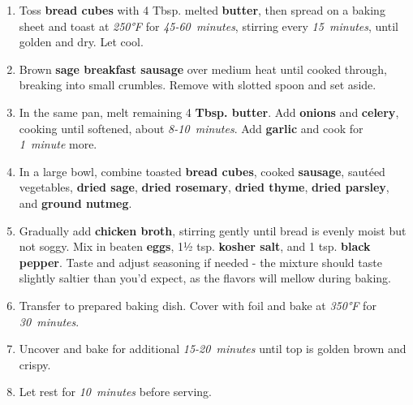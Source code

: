 \documentclass[11pt,letterpaper]{article}
\begin{document}
\begin{enumerate}
    \item Toss \textbf{bread cubes} with 4 Tbsp. melted \textbf{butter}, then spread on a baking sheet and toast at \textit{250°F} for \textit{45-60~minutes}, stirring every \textit{15~minutes}, until golden and dry. Let cool.
    
    \item Brown \textbf{sage breakfast sausage} over medium heat until cooked through, breaking into small crumbles. Remove with slotted spoon and set aside.
    
    \item In the same pan, melt remaining 4 \textbf{Tbsp. butter}. Add \textbf{onions} and \textbf{celery}, cooking until softened, about \textit{8-10~minutes}. Add \textbf{garlic} and cook for \textit{1~minute} more.
    
    \item In a large bowl, combine toasted \textbf{bread cubes}, cooked \textbf{sausage}, sautéed vegetables, \textbf{dried sage}, \textbf{dried rosemary}, \textbf{dried thyme}, \textbf{dried parsley}, and \textbf{ground nutmeg}.
    
    \item Gradually add \textbf{chicken broth}, stirring gently until bread is evenly moist but not soggy. Mix in beaten \textbf{eggs}, 1½ tsp. \textbf{kosher salt}, and 1 tsp. \textbf{black pepper}. Taste and adjust seasoning if needed - the mixture should taste slightly saltier than you'd expect, as the flavors will mellow during baking.
    
    \item Transfer to prepared baking dish. Cover with foil and bake at \textit{350°F} for \textit{30~minutes}.
    
    \item Uncover and bake for additional \textit{15-20~minutes} until top is golden brown and crispy.
    
    \item Let rest for \textit{10~minutes} before serving.
\end{enumerate}
\end{document}
